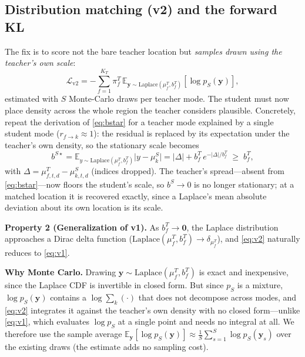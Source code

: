 \documentclass[conference]{IEEEtran}
\newcommand{\Lap}{\mathrm{Laplace}}
\newcommand{\loc}{\mu}
\newcommand{\scale}{b}
\newcommand{\E}{\mathbb{E}}
\begin{document}
\subsection{Distribution matching (v2) and the forward KL}
The fix is to score not the bare teacher location but \emph{samples drawn using the
teacher's own scale}:
\begin{equation}
  \label{eq:v2}
  \mathcal{L}_{\mathrm{v2}} = -\textstyle\sum_{f=1}^{K_T}\pi^T_f\,
    \E_{\mathbf{y}\sim\Lap(\loc^T_f,\scale^T_f)}\!\left[\log p_S(\mathbf{y})\right],
\end{equation}
estimated with $S$ Monte-Carlo draws per teacher mode. The student must now place
density across the whole region the teacher considers plausible. Concretely, repeat
the derivation of \eqref{eq:bstar} for a teacher mode explained by a single student
mode ($r_{f\to k}\!\approx\!1$): the residual is replaced by its expectation under
the teacher's own density, so the stationary scale becomes
\begin{equation}
  \label{eq:v2resid}
  \scale^{S\star}=\E_{y\sim\Lap(\loc^T_f,\scale^T_f)}\lvert y-\loc^S_k\rvert
   = \lvert\Delta\rvert+\scale^T_f\,e^{-\lvert\Delta\rvert/\scale^T_f}
   \;\ge\;\scale^T_f ,
\end{equation}
with $\Delta=\loc^T_{f,t,d}-\loc^S_{k,t,d}$ (indices dropped). The teacher's
spread---absent from \eqref{eq:bstar}---now floors the student's scale, so
$\scale^S\!\to\!0$ is no longer stationary; at a matched location it is recovered
exactly, since a Laplace's mean absolute deviation about its own location is its
scale.

\textbf{Property 2 (Generalization of v1).} 
As $\scale^T_f\to\mathbf{0}$, the Laplace distribution approaches a Dirac delta function
 ($\Lap(\loc^T_f,\scale^T_f)\to\delta_{\loc^T_f}$), and \eqref{eq:v2} naturally reduces to \eqref{eq:v1}.

\textbf{Why Monte Carlo.} Drawing $\mathbf{y}\sim\Lap(\loc^T_f,\scale^T_f)$ is exact
and inexpensive, since the Laplace CDF is invertible in closed form.
But since $p_S$ is a mixture, $\log p_S(\mathbf{y})$ contains a $\log\sum_k(\cdot)$ that
does not decompose across modes, and \eqref{eq:v2} integrates it against the
teacher's own density with no closed form---unlike \eqref{eq:v1}, which evaluates
$\log p_S$ at a single point and needs no integral at all. We therefore use the
sample average $\E_{\mathbf{y}}[\log p_S(\mathbf{y})]\approx\frac{1}{S}
\sum_{s=1}^{S}\log p_S(\mathbf{y}_s)$ over the existing draws (the
estimate adds no sampling cost).
\end{document}
